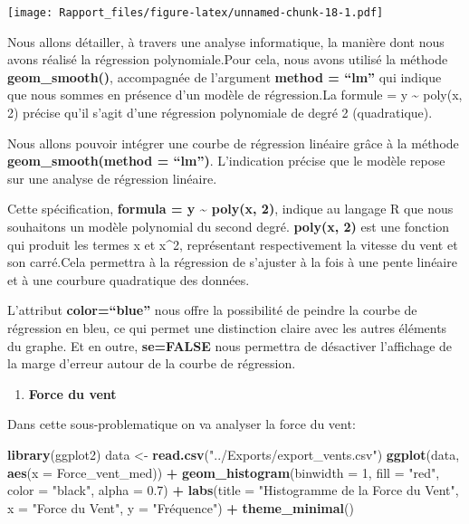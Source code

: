 \documentclass[
]{article}
\newenvironment{Shaded}{\begin{snugshade}}{\end{snugshade}}
\newcommand{\AttributeTok}[1]{\textcolor[rgb]{0.13,0.29,0.53}{#1}}
\newcommand{\DecValTok}[1]{\textcolor[rgb]{0.00,0.00,0.81}{#1}}
\newcommand{\FloatTok}[1]{\textcolor[rgb]{0.00,0.00,0.81}{#1}}
\newcommand{\FunctionTok}[1]{\textcolor[rgb]{0.13,0.29,0.53}{\textbf{#1}}}
\newcommand{\NormalTok}[1]{#1}
\newcommand{\OtherTok}[1]{\textcolor[rgb]{0.56,0.35,0.01}{#1}}
\newcommand{\SpecialCharTok}[1]{\textcolor[rgb]{0.81,0.36,0.00}{\textbf{#1}}}
\newcommand{\StringTok}[1]{\textcolor[rgb]{0.31,0.60,0.02}{#1}}
\providecommand{\tightlist}{%
  \setlength{\itemsep}{0pt}\setlength{\parskip}{0pt}}
\begin{document}
\texttt{[image: Rapport\_files/figure-latex/unnamed-chunk-18-1.pdf]}

Nous allons détailler, à travers une analyse informatique, la manière
dont nous avons réalisé la régression polynomiale.Pour cela, nous avons
utilisé la méthode \textbf{geom\_smooth()}, accompagnée de l'argument
\textbf{method = ``lm''} qui indique que nous sommes en présence d'un
modèle de régression.La formule = y \textasciitilde{} poly(x, 2) précise
qu'il s'agit d'une régression polynomiale de degré 2 (quadratique).

Nous allons pouvoir intégrer une courbe de régression linéaire grâce à
la méthode \textbf{geom\_smooth(method = ``lm'')}. L'indication précise
que le modèle repose sur une analyse de régression linéaire.

Cette spécification, \textbf{formula = y \textasciitilde{} poly(x, 2)},
indique au langage R que nous souhaitons un modèle polynomial du second
degré. \textbf{poly(x, 2)} est une fonction qui produit les termes x et
x\^{}2, représentant respectivement la vitesse du vent et son carré.Cela
permettra à la régression de s'ajuster à la fois à une pente linéaire et
à une courbure quadratique des données.

L'attribut \textbf{color=``blue''} nous offre la possibilité de peindre
la courbe de régression en bleu, ce qui permet une distinction claire
avec les autres éléments du graphe. Et en outre, \textbf{se=FALSE} nous
permettra de désactiver l'affichage de la marge d'erreur autour de la
courbe de régression.

\begin{enumerate}
\def\labelenumi{\arabic{enumi}.}
\tightlist
\item
  \textbf{Force du vent}
\end{enumerate}

Dans cette sous-problematique on va analyser la force du vent:

\begin{Shaded}
\begin{Highlighting}[]
\FunctionTok{library}\NormalTok{(ggplot2)}
\NormalTok{data }\OtherTok{\textless{}{-}} \FunctionTok{read.csv}\NormalTok{(}\StringTok{"../Exports/export\_vents.csv"}\NormalTok{)}
\FunctionTok{ggplot}\NormalTok{(data, }\FunctionTok{aes}\NormalTok{(}\AttributeTok{x =}\NormalTok{ Force\_vent\_med)) }\SpecialCharTok{+}
  \FunctionTok{geom\_histogram}\NormalTok{(}\AttributeTok{binwidth =} \DecValTok{1}\NormalTok{, }\AttributeTok{fill =} \StringTok{"red"}\NormalTok{, }\AttributeTok{color =} \StringTok{"black"}\NormalTok{, }\AttributeTok{alpha =} \FloatTok{0.7}\NormalTok{) }\SpecialCharTok{+}
  \FunctionTok{labs}\NormalTok{(}\AttributeTok{title =} \StringTok{"Histogramme de la Force du Vent"}\NormalTok{, }\AttributeTok{x =} \StringTok{"Force du Vent"}\NormalTok{, }\AttributeTok{y =} \StringTok{"Fréquence"}\NormalTok{) }\SpecialCharTok{+}
  \FunctionTok{theme\_minimal}\NormalTok{()}
\end{Highlighting}
\end{Shaded}
\end{document}
